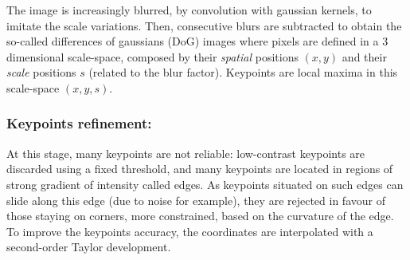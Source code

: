 \documentclass[preprint]{iucr}
\begin{document}
The image is increasingly blurred, by convolution with gaussian kernels, to
imitate the scale variations.
Then, consecutive blurs are subtracted to obtain the so-called differences of
gaussians (DoG) images where pixels are defined in a 3 dimensional
scale-space, composed by  their \emph{spatial} positions $(x, y)$ and their
\emph{scale} positions $s$ (related to the blur factor). Keypoints are
local maxima in this scale-space $(x, y, s)$.



\subsubsection{Keypoints refinement:}

At this stage, many keypoints are not reliable: low-contrast keypoints are
discarded using a fixed threshold, and many keypoints are located in regions of
strong gradient of intensity called edges. As keypoints situated on such edges
can slide along this edge (due to noise for example), they are rejected in
favour of those staying on corners, more constrained, based on the curvature
of the edge.
To improve the keypoints accuracy, the coordinates are interpolated with a
second-order Taylor development.
\end{document}
